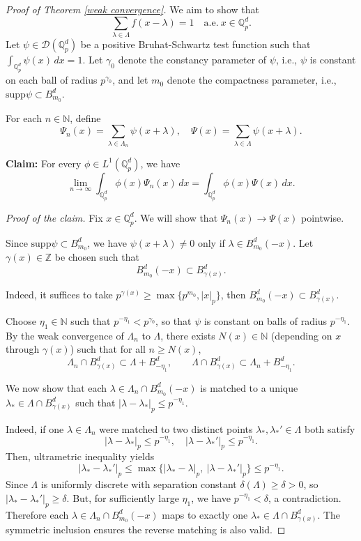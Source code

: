 \documentclass[a4paper,12pt]{amsart}
\def\Q{\mathbb{Q}}
\def\Qp{\mathbb{Q}_p}
\newcommand{\supp}{\text{supp}}
\begin{document}
\begin{proof}[Proof of Theorem \ref{weak convergence}]

We aim to show that
\[
\sum_{\lambda \in \Lambda} f(x - \lambda) = 1 \quad \text{a.e.} \ x \in \Q_p^d.
\]
Let $\psi \in \mathcal{D}(\Qp^d)$ be a positive Bruhat-Schwartz test function  such that $\int_{\Qp^d} \psi(x) \, dx = 1$.
Let $\gamma_0$ denote the constancy parameter of $\psi$, i.e., $\psi$ is constant on each ball of radius $p^{\gamma_0}$, and let $m_0$ denote the compactness parameter, i.e., $\supp \psi \subset B_{m_0}^d$.

For each $n\in\mathbb{N}$, define
\[
\Psi_n(x) = \sum_{\lambda \in \Lambda_n} \psi(x + \lambda), \quad \Psi(x) = \sum_{\lambda \in \Lambda} \psi(x + \lambda).
\]



\textbf{Claim:} %
For every $\phi\in L^1(\mathbb{Q}_p^d)$, we have
\[
\lim_{n\to\infty}\int_{\mathbb{Q}_p^d}\phi(x)\Psi_n(x)\,dx
=
\int_{\mathbb{Q}_p^d}\phi(x)\Psi(x)\,dx.
\]

\textit{Proof of the claim.}
Fix $x\in \Qp^d$. We will show that $\Psi_n(x)\to \Psi(x)$ pointwise.

Since $\supp \psi \subset B_{m_0}^d$, we have $\psi(x+\lambda)\neq 0$ only if
 $\lambda\in B_{m_0}^d(-x)$. Let $\gamma(x)\in \mathbb{Z}$ be chosen such that
\[
B_{m_0}^d(-x)\subset B_{\gamma(x)}^d.
\]

Indeed, it suffices to take $p^{\gamma(x)}\ge \max\{p^{m_0}, |x|_p\}$,
then $B_{m_0}^d(-x)\subset B_{\gamma(x)}^d$.

Choose $\eta_1\in\mathbb{N}$ such that $p^{-\eta_1}<p^{\gamma_0}$,
so that $\psi$ is constant on balls of radius $p^{-\eta_1}$. By the weak convergence of
$\Lambda_n$ to $\Lambda$, there exists $N(x)\in\mathbb{N}$ (depending on $x$ through $\gamma(x)$)
such that for all $n\ge N(x)$,
\[
\Lambda_n\cap B_{\gamma(x)}^d \subset \Lambda + B_{-\eta_1}^d,\qquad
\Lambda\cap B_{\gamma(x)}^d \subset \Lambda_n + B_{-\eta_1}^d.
\]


We now show that each $\lambda\in \Lambda_n\cap B_{m_0}^d(-x)$ is matched to a unique
$\lambda_*\in \Lambda\cap B_{\gamma(x)}^d $ such that $|\lambda-\lambda_*|_p\le p^{-\eta_1}$.



Indeed, if one $\lambda\in\Lambda_n$ were matched to
two distinct points  $\lambda_*,\lambda_*'\in\Lambda$ both satisfy
$$|\lambda-\lambda_*|_p\le p^{-\eta_1},\quad |\lambda-\lambda_*'|_p\le p^{-\eta_1}.$$
Then, ultrametric inequality yields
\[
|\lambda_*-\lambda_*'|_p \le \max\big\{|\lambda_*-\lambda|_p,\ |\lambda-\lambda_*'|_p\big\} \le p^{-\eta_1}.
\]
Since $\Lambda$ is uniformly discrete with  separation constant $\delta(\Lambda)\ge\delta>0$,
so $|\lambda_*-\lambda_*'|_p\ge\delta$. But, for sufficiently large $\eta_1$, we have
$p^{-\eta_1}<\delta$, a contradiction. Therefore each $\lambda\in \Lambda_n\cap B_{m_0}^d(-x)$ maps to exactly one
$\lambda_*\in \Lambda\cap B_{\gamma(x)}^d$.  The symmetric inclusion ensures the reverse matching is also valid.


\end{proof}
\end{document}
